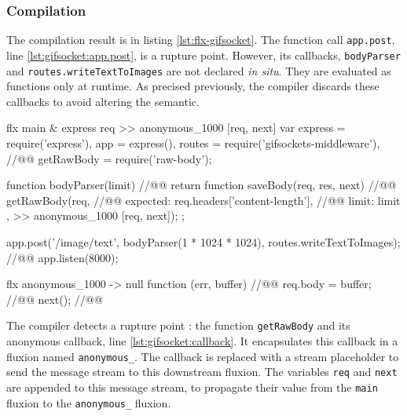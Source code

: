 \subsubsection{Compilation} \label{chapter5:flx:evaluation:compilation}

The compilation result is in listing \ref{lst:flx-gifsocket}.
The function call \texttt{app.post}, line \ref{lst:gifsocket:app.post}, is a rupture point.
However, its callbacks, \texttt{bodyParser} and \texttt{routes.write\-Text\-To\-Images} are not declared \textit{in situ}.
They are evaluated as functions only at runtime.
As precised previously, the compiler discards these callbacks to avoid altering the semantic. %

\begin{code}[flx, caption={Compilation result of gifsockets-server},label={lst:flx-gifsocket}]
flx main & express {req}
>> anonymous_1000 [req, next]
  var express = require('express'),
      app = express(),
      routes = require('gifsockets-middleware'), //@\label{lst:flx-gifsocket:gif-mw}@
      getRawBody = require('raw-body');

  function bodyParser(limit) { //@\label{lst:flx-gifsocket:bodyParser}@
    return function saveBody(req, res, next) { //@\label{lst:flx-gifsocket:saveBody}@
      getRawBody(req, { //@\label{lst:flx-gifsocket:getRawBody}@
        expected: req.headers['content-length'], //@\label{lst:flx-gifsocket:req.headers}@
        limit: limit
      }, >> anonymous_1000 [req, next]);
    };
  }

  app.post('/image/text', bodyParser(1 * 1024 * 1024), routes.writeTextToImages); //@\label{lst:flx-gifsocket:app.post}@
  app.listen(8000);

flx anonymous_1000
-> null
  function (err, buffer) { //@\label{lst:flx-gifsocket:callback}@
    req.body = buffer; //@\label{lst:flx-gifsocket:buffer}@
    next(); //@\label{lst:flx-gifsocket:next}@
  }
\end{code}

The compiler detects a rupture point : the function \texttt{get\-Raw\-Body} and its anonymous callback, line \ref{lst:gifsocket:callback}.
It encapsulates this callback in a fluxion named \texttt{anonymous\_}.
The callback is replaced with a stream placeholder to send the message stream to this downstream fluxion.
The variables \texttt{req} and \texttt{next} are appended to this message stream, to propagate their value from the \texttt{main} fluxion to the \texttt{anonymous\_} fluxion.

